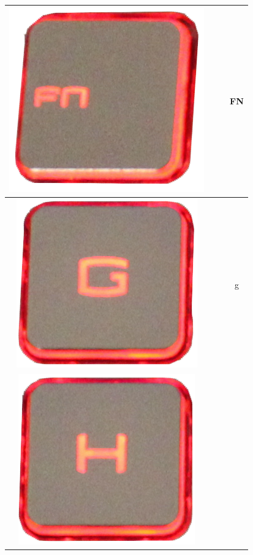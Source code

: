 \begin{longtable}{cccc}
\begin{minipage}[c]{.3\textwidth}
\includegraphics[scale=0.1]{Images/KeyMapping/FN}
\vspace{0.2cm}
\end{minipage} & & & FN\\
\hline
\begin{minipage}[c]{.3\textwidth}
\vspace{0.2cm}
\includegraphics[scale=0.1]{Images/KeyMapping/g}
\vspace{0.2cm}
\end{minipage} & & & g\\
\hline
\begin{minipage}[c]{.3\textwidth}
\vspace{0.2cm}
\includegraphics[scale=0.1]{Images/KeyMapping/h}

\end{minipage}
\end{longtable}
